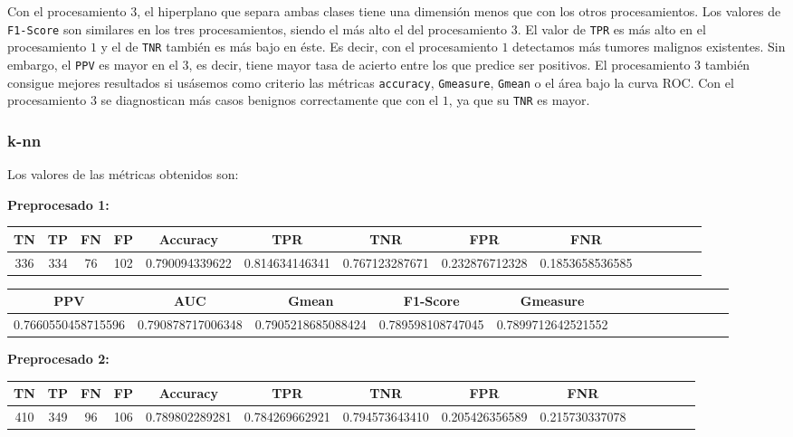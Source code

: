 \documentclass[a4]{article}
\begin{document}
Con el procesamiento $3$, el hiperplano que separa ambas clases tiene una dimensión menos que con los otros procesamientos. Los valores de \texttt{F1-Score} son similares en los tres procesamientos, siendo el más alto el del procesamiento $3$. El valor de \texttt{TPR} es más alto en el procesamiento $1$ y el de \texttt{TNR} también es más bajo en éste. Es decir, con el procesamiento $1$ detectamos más tumores malignos existentes. Sin embargo, el \texttt{PPV} es mayor en el $3$, es decir, tiene mayor tasa de acierto entre los que predice ser positivos.  El procesamiento $3$ también consigue mejores resultados si usásemos como criterio las métricas \texttt{accuracy}, \texttt{Gmeasure}, \texttt{Gmean} o el área bajo la curva ROC. Con el procesamiento $3$ se diagnostican más casos benignos correctamente que con el $1$, ya que su \texttt{TNR} es mayor.

\subsubsection{k-nn}

Los valores de las métricas obtenidos son:\\
\vspace{-4mm}

\textbf{Preprocesado 1:}
\begin{center}
\begin{tabular}{|c|c|c|c|c|c|c|c|c|c|c|c|c|c|}
\hline
\multicolumn{1}{|c|}{\textbf{TN}}& \textbf{TP} & \textbf{FN} & \textbf{FP} & \textbf{Accuracy} & \textbf{TPR} & \textbf{TNR} & \textbf{FPR} &\textbf{FNR} \\ \hline
  336 & 334 & 76 & 102 & 0.790094339622 & 0.814634146341 & 0.767123287671 & 0.232876712328 & 0.1853658536585 \\ \hline
\end{tabular}
\end{center}

\begin{center}
\begin{tabular}{|c|c|c|c|c|c|c|c|c|c|c|c|c|c|}
\hline
\multicolumn{1}{|c|}{\textbf{PPV}} & \textbf{AUC} & \textbf{Gmean} & \textbf{F1-Score} & \textbf{Gmeasure}  \\ \hline
  0.7660550458715596 & 0.790878717006348 & 0.7905218685088424 & 0.789598108747045 & 0.7899712642521552 \\ \hline
\end{tabular}
\end{center}

\textbf{Preprocesado 2:}
\begin{center}
\begin{tabular}{|c|c|c|c|c|c|c|c|c|c|c|c|c|c|}
\hline
\multicolumn{1}{|c|}{\textbf{TN}}& \textbf{TP} & \textbf{FN} & \textbf{FP} & \textbf{Accuracy} & \textbf{TPR} & \textbf{TNR} & \textbf{FPR} &\textbf{FNR} \\ \hline
  410 & 349 & 96 & 106 & 0.789802289281 & 0.784269662921 & 0.794573643410 & 0.205426356589 & 0.215730337078 \\ \hline
\end{tabular}
\end{center}
\end{document}
